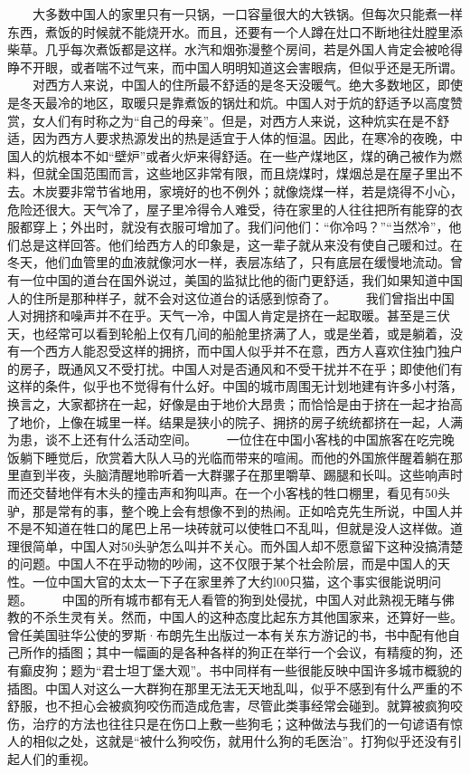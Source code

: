 \documentclass[12pt,oneside]{book}
\begin{document}
\begin{common-format}
　　大多数中国人的家里只有一只锅，一口容量很大的大铁锅。但每次只能煮一样东西，煮饭的时候就不能烧开水。而且，还要有一个人蹲在灶口不断地往灶膛里添柴草。几乎每次煮饭都是这样。水汽和烟弥漫整个房间，若是外国人肯定会被呛得睁不开眼，或者喘不过气来，而中国人明明知道这会害眼病，但似乎还是无所谓。 
　　对西方人来说，中国人的住所最不舒适的是冬天没暖气。绝大多数地区，即使是冬天最冷的地区，取暖只是靠煮饭的锅灶和炕。中国人对于炕的舒适予以高度赞赏，女人们有时称之为“自己的母亲”。但是，对西方人来说，这种炕实在是不舒适，因为西方人要求热源发出的热是适宜于人体的恒温。因此，在寒冷的夜晚，中国人的炕根本不如“壁炉”或者火炉来得舒适。在一些产煤地区，煤的确己被作为燃料，但就全国范围而言，这些地区非常有限，而且烧煤时，煤烟总是在屋子里出不去。木炭要非常节省地用，家境好的也不例外；就像烧煤一样，若是烧得不小心，危险还很大。天气冷了，屋子里冷得令人难受，待在家里的人往往把所有能穿的衣服都穿上；外出时，就没有衣服可增加了。我们问他们：“你冷吗？”“当然冷”，他们总是这样回答。他们给西方人的印象是，这一辈子就从来没有使自己暖和过。在冬天，他们血管里的血液就像河水一样，表层冻结了，只有底层在缓慢地流动。曾有一位中国的道台在国外说过，美国的监狱比他的衙门更舒适，我们如果知道中国人的住所是那种样子，就不会对这位道台的话感到惊奇了。 
　　我们曾指出中国人对拥挤和噪声并不在乎。天气一冷，中国人肯定是挤在一起取暖。甚至是三伏天，也经常可以看到轮船上仅有几间的船舱里挤满了人，或是坐着，或是躺着，没有一个西方人能忍受这样的拥挤，而中国人似乎并不在意，西方人喜欢住独门独户的房子，既通风又不受打扰。中国人对是否通风和不受干扰并不在乎；即使他们有这样的条件，似乎也不觉得有什么好。中国的城市周围无计划地建有许多小村落，换言之，大家都挤在一起，好像是由于地价大昂贵；而恰恰是由于挤在一起才抬高了地价，上像在城里一样。结果是狭小的院子、拥挤的房子统统都挤在一起，人满为患，谈不上还有什么活动空间。 
　　一位住在中国小客栈的中国旅客在吃完晚饭躺下睡觉后，欣赏着大队人马的光临而带来的喧闹。而他的外国旅伴醒着躺在那里直到半夜，头脑清醒地聆听着一大群骡子在那里嚼草、踢腿和长叫。这些响声时而还交替地伴有木头的撞击声和狗叫声。在一个小客栈的牲口棚里，看见有50头驴，那是常有的事，整个晚上会有想像不到的热闹。正如哈克先生所说，中国人并不是不知道在牲口的尾巴上吊一块砖就可以使牲口不乱叫，但就是没人这样做。道理很简单，中国人对50头驴怎么叫并不关心。而外国人却不愿意留下这种没搞清楚的问题。中国人不在乎动物的吵闹，这不仅限于某个社会阶层，而是中国人的天性。一位中国大官的太太一下子在家里养了大约l00只猫，这个事实很能说明问题。 
　　中国的所有城市都有无人看管的狗到处侵扰，中国人对此熟视无睹与佛教的不杀生灵有关。然而，中国人的这种态度比起东方其他国家来，还算好一些。曾任美国驻华公使的罗斯·布朗先生出版过一本有关东方游记的书，书中配有他自己所作的插图；其中一幅画的是各种各样的狗正在举行一个会议，有精瘦的狗，还有癫皮狗；题为“君士坦丁堡大观”。书中同样有一些很能反映中国许多城市概貌的插图。中国人对这么一大群狗在那里无法无天地乱叫，似乎不感到有什么严重的不舒服，也不担心会被疯狗咬伤而造成危害，尽管此类事经常会碰到。就算被疯狗咬伤，治疗的方法也往往只是在伤口上敷一些狗毛；这种做法与我们的一句谚语有惊人的相似之处，这就是“被什么狗咬伤，就用什么狗的毛医治”。打狗似乎还没有引起人们的重视。 

\end{common-format}
\end{document}
